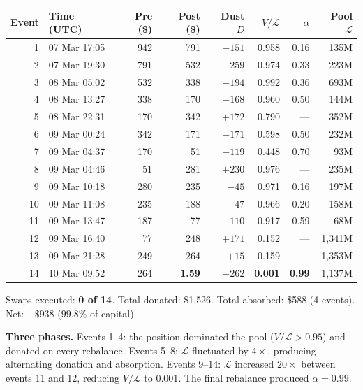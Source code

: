 \documentclass[11pt,a4paper]{article}
\begin{document}
\begin{table}[H]
\centering\small
\begin{tabular}{@{}rlrrrrrr@{}}
\toprule
Event & Time (UTC) & Pre (\$) & Post (\$) & Dust $D$ & $V/\mathcal{L}$ & $\alpha$ & Pool $\mathcal{L}$ \\
\midrule
1  & 07 Mar 17:05 & 942 & 791  & $-151$              & 0.958          & 0.16            & 135M \\
2  & 07 Mar 19:30 & 791 & 532  & $-259$              & 0.974          & 0.33            & 223M \\
3  & 08 Mar 05:02 & 532 & 338  & $-194$              & 0.992          & 0.36            & 693M \\
4  & 08 Mar 13:27 & 338 & 170  & $-168$              & 0.960          & 0.50            & 144M \\
5  & 08 Mar 22:31 & 170 & 342  & \textbf{$+172$}     & 0.790          & ---             & 352M \\
6  & 09 Mar 00:24 & 342 & 171  & $-171$              & 0.598          & 0.50            & 232M \\
7  & 09 Mar 04:37 & 170 & 51   & $-119$              & 0.448          & 0.70            & 93M \\
8  & 09 Mar 04:46 & 51  & 281  & \textbf{$+230$}     & 0.976          & ---             & 235M \\
9  & 09 Mar 10:18 & 280 & 235  & $-45$               & 0.971          & 0.16            & 197M \\
10 & 09 Mar 11:08 & 235 & 188  & $-47$               & 0.966          & 0.20            & 158M \\
11 & 09 Mar 13:47 & 187 & 77   & $-110$              & 0.917          & 0.59            & 68M \\
12 & 09 Mar 16:40 & 77  & 248  & \textbf{$+171$}     & 0.152          & ---             & 1{,}341M \\
13 & 09 Mar 21:28 & 249 & 264  & $+15$               & 0.159          & ---             & 1{,}353M \\
14 & 10 Mar 09:52 & 264 & \textbf{1.59} & $-262$     & \textbf{0.001} & \textbf{0.99}   & 1{,}137M \\
\bottomrule
\end{tabular}
\end{table}

Swaps executed: \textbf{0 of 14}. Total donated: \$1{,}526. Total absorbed: \$588 (4 events). Net: $-\$938$ ($99.8\%$ of capital).

\textbf{Three phases.} Events 1--4: the position dominated the pool ($V/\mathcal{L} > 0.95$) and donated on every rebalance. Events 5--8: $\mathcal{L}$ fluctuated by $4\times$, producing alternating donation and absorption. Events 9--14: $\mathcal{L}$ increased $20\times$ between events 11 and 12, reducing $V/\mathcal{L}$ to $0.001$. The final rebalance produced $\alpha = 0.99$.
\end{document}
